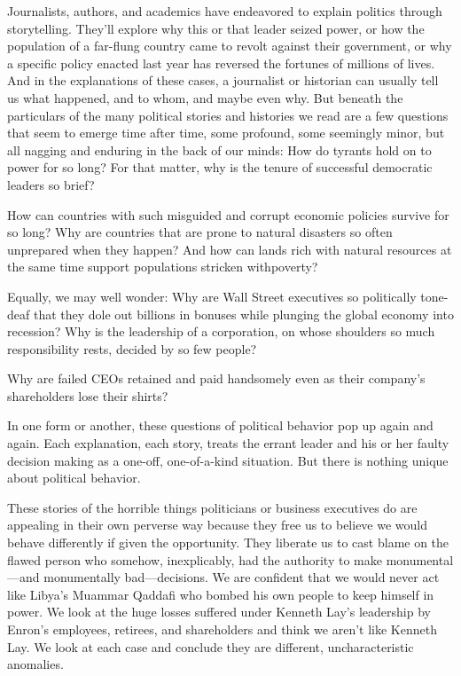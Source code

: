 \documentclass[10pt]{article}
\begin{document}
{\large Journalists, authors, and academics have endeavored to explain politics
through storytelling. They'll explore why this or that leader seized power, or
how the population of a far-flung country came to revolt against their
government, or why a specific policy enacted last year has reversed the fortunes
of millions of lives. And in the explanations of these cases, a journalist or
historian can usually tell us what happened, and to whom, and maybe even why. But
beneath the particulars of the many political stories and histories we read are a
few questions that seem to emerge time after time, some profound, some seemingly
minor, but all nagging and enduring in the back of our minds: How do tyrants hold
on to power for so long? For that matter, why is the tenure of successful
democratic leaders so brief?}

{\large How can countries with such misguided and corrupt economic policies
survive for so long? Why are countries that are prone to natural disasters so
often unprepared when they happen? And how can lands rich with natural resources
at the same time support populations stricken withpoverty?}

{\large Equally, we may well wonder: Why are Wall Street executives so
politically tone-deaf that they dole out billions in bonuses while plunging the
global economy into recession? Why is the leadership of a corporation, on whose
shoulders so much responsibility rests, decided by so few people?}

{\large Why are failed CEOs retained and paid handsomely even as their company's
shareholders lose their shirts?}

{\large In one form or another, these questions of political behavior pop up
again and again. Each explanation, each story, treats the errant leader and his
or her faulty decision making as a one-off, one-of-a-kind situation. But there is
nothing unique about political behavior.}

{\large These stories of the horrible things politicians or business executives
do are appealing in their own perverse way because they free us to believe we
would behave differently if given the opportunity. They liberate us to cast blame
on the flawed person who somehow, inexplicably, had the authority to make
monumental---and monumentally bad---decisions. We are confident that we would
never act like Libya's Muammar Qaddafi who bombed his own people to keep himself
in power. We look at the huge losses suffered under Kenneth Lay's leadership by
Enron's employees, retirees, and shareholders and think we aren't like Kenneth
Lay. We look at each case and conclude they are different, uncharacteristic
anomalies.}
\end{document}
